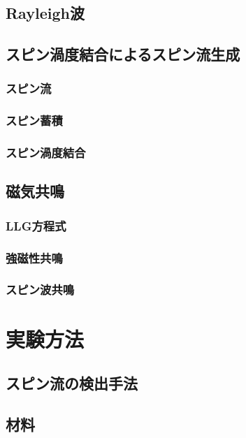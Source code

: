 \documentclass[dvipdfmx]{jsreport}
\numberwithin{equation}{chapter}
\numberwithin{table}{chapter}
\begin{document}
\section{Rayleigh波}
\section{スピン渦度結合によるスピン流生成}
\subsection{スピン流}
\subsection{スピン蓄積}
\subsection{スピン渦度結合}
\section{磁気共鳴}
\subsection{LLG方程式}
\subsection{強磁性共鳴}
\subsection{スピン波共鳴}
\chapter{実験方法}
\section{スピン流の検出手法}
\section{材料}
\subsection{}
\subsection{}
\subsection{}
\end{document}
